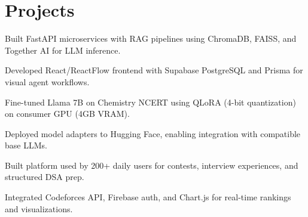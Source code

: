 \documentclass[]{deedy-resume-openfont}
\begin{document}
\begin{minipage}[t]{0.66\textwidth}

\section{Projects}

\begin{tightemize}
\item Built FastAPI microservices with RAG pipelines using ChromaDB, FAISS, and Together AI for LLM inference.
\item Developed React/ReactFlow frontend with Supabase PostgreSQL and Prisma for visual agent workflows.
\end{tightemize}
\sectionsep

\begin{tightemize}
\item Fine-tuned Llama 7B on Chemistry NCERT using QLoRA (4-bit quantization) on consumer GPU (4GB VRAM).
\item Deployed model adapters to Hugging Face, enabling integration with compatible base LLMs.
\end{tightemize}
\sectionsep

\begin{tightemize}
\item Built platform used by 200+ daily users for contests, interview experiences, and structured DSA prep.
\item Integrated Codeforces API, Firebase auth, and Chart.js for real-time rankings and visualizations.
\end{tightemize}

\end{minipage}
\end{document}
